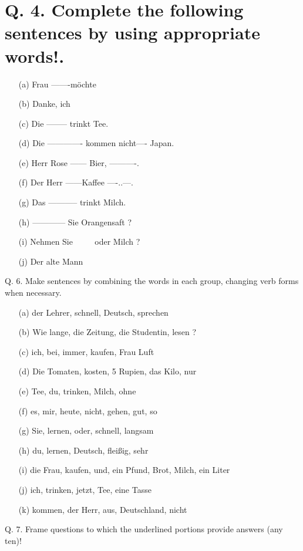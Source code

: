 \documentclass{article}
\begin{document}
\section*{Q. 4. Complete the following sentences by using appropriate words!.}
\begin{enumerate}
    \item[(a)] Frau -------möchte \(\qquad\)
    \item[(b)] Danke, ich \(\qquad\)
    \item[(c)] Die -------- trinkt Tee.
    \item[(d)] Die ------------- kommen nicht---- Japan.
    \item[(e)] Herr Rose ------ Bier, ----------.
    \item[(f)] Der Herr ------Kaffee ----..---.
    \item[(g)] Das ----------- trinkt Milch.
    \item[(h)] ------------ Sie Orangensaft ?
    \item[(i)] Nehmen Sie \(\qquad\) oder Milch ?
    \item[(j)] Der alte Mann \(\qquad\)
\end{enumerate}
Q. 6. Make sentences by combining the words in each group, changing verb forms when necessary.
\begin{enumerate}
    \item[(a)] der Lehrer, schnell, Deutsch, sprechen
    \item[(b)] Wie lange, die Zeitung, die Studentin, lesen ?
    \item[(c)] ich, bei, immer, kaufen, Frau Luft
    \item[(d)] Die Tomaten, kosten, 5 Rupien, das Kilo, nur
    \item[(e)] Tee, du, trinken, Milch, ohne
    \item[(f)] es, mir, heute, nicht, gehen, gut, so
    \item[(g)] Sie, lernen, oder, schnell, langsam
    \item[(h)] du, lernen, Deutsch, fleißig, sehr
    \item[(i)] die Frau, kaufen, und, ein Pfund, Brot, Milch, ein Liter
    \item[(j)] ich, trinken, jetzt, Tee, eine Tasse
    \item[(k)] kommen, der Herr, aus, Deutschland, nicht
\end{enumerate}
Q. 7. Frame questions to which the underlined portions provide answers (any ten)!
\end{document}
